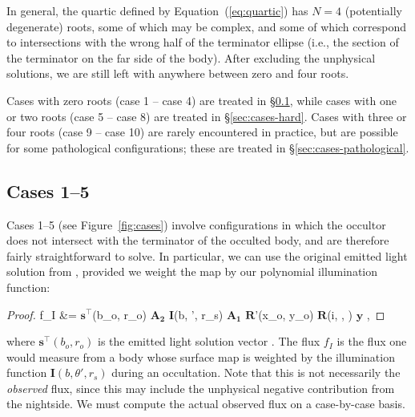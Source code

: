\documentclass[modern]{aastex62}
\newcommand{\BF}[1]{\ensuremath{\mathbf{#1}}}
\newcommand{\sTe}{\ensuremath{\BF{s}^\top}}
\begin{document}
In general, the quartic defined by Equation~(\ref{eq:quartic}) has
$N=4$ (potentially degenerate) roots, some of which may be complex, and some
of which correspond to intersections with the wrong half of the
terminator ellipse (i.e., the section of the terminator on the far side
of the body). After excluding the unphysical solutions, we are still left with
anywhere between zero and four roots.

Cases with zero roots (case 1 -- case 4) are treated in \S\ref{sec:cases-easy},
while cases with one or two roots (case 5 -- case 8) are treated in
\S\ref{sec:cases-hard}. Cases with three or four roots
(case 9 -- case 10) are rarely encountered
in practice, but are possible for some pathological configurations; these are
treated in \S\ref{sec:cases-pathological}.

%

\subsection{Cases 1--5}
\label{sec:cases-easy}
%
Cases 1--5 (see Figure~\ref{fig:cases}) involve configurations in which the
occultor does not intersect with
the terminator of the occulted body, and are therefore fairly
straightforward to solve. In particular, we can use the original emitted
light solution from \citet{Luger2019}, provided we weight the map by our
polynomial illumination function:
%
\begin{proof}{}
    \label{eq:fI}
    f_I &=
    \sTe(b_o, r_o)
    \BF{A_2}
    \BF{I}(b, \theta', r_s)
    \BF{A_1}
    \BF{R}'(x_o, y_o)
    \BF{R}(i, \lambda, \vartheta)
    \BF{y}
    \quad,
\end{proof}
%
where $\sTe(b_o, r_o)$ is the emitted light solution vector
\citep[Equation~26 in][]{Luger2019}. The flux $f_I$ is the flux one would
measure from a body whose surface map is weighted by the illumination function
$\BF{I}(b, \theta', r_s)$ during an occultation. Note that this is not
necessarily the \emph{observed} flux, since this may include the unphysical
negative contribution from the nightside. We must compute the actual
observed flux on a case-by-case basis.
\end{document}
